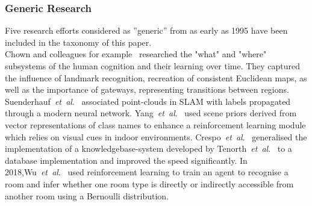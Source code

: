 \documentclass[twocolumn,letterpaper]{IEEEAerospaceCLS}  %
\newcommand{\abbreviation}[1]{\emph{#1}.}
\newcommand{\etal}{\abbreviation{et~al}}
\begin{document}
\subsubsection{Generic Research} \label{sssec:ResLitHist}
Five research efforts considered as ''generic'' from as early as 1995  have been included in the taxonomy of this paper.\\
Chown and colleagues for example~\cite{chown_prototypes_1995} researched the "what" and "where" subsystems of the human cognition and their learning over time. They captured the influence of landmark recognition, recreation of consistent Euclidean maps, as well as the importance of gateways, representing transitions between regions. Suenderhauf~\etal~\cite{sunderhauf_meaningful_2017} associated point-clouds in SLAM with labels propagated through a modern neural network. Yang~\etal~\cite{yang_visual_2018} used scene priors derived from vector representations of class names to enhance a reinforcement learning module which relies on visual cues in indoor environments. Crespo~\etal~\cite{crespo_reasoning_2018} generalised the implementation of a knowledgebase-system developed by Tenorth~\etal~\cite{tenorth_knowrob-map_2010} to a database implementation and improved the speed significantly. In 2018,Wu~\etal~\cite{wu_learning_2018} used reinforcement learning to train an agent to recognise a room and infer whether one room type is directly or indirectly accessible from another room using a Bernoulli distribution.
\end{document}
